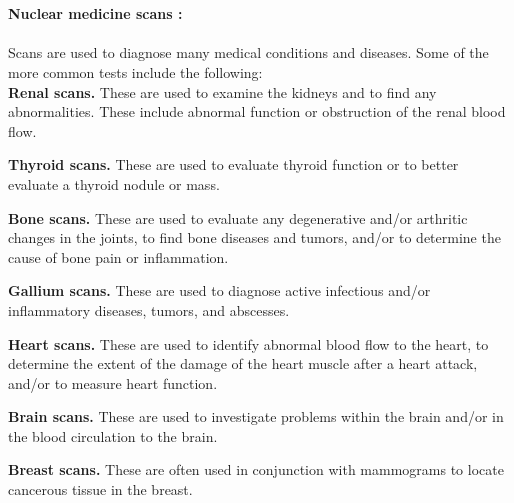 \documentclass[12pt]{article}
\begin{document}
\\ \\\noindent  \textbf{\large  Nuclear medicine scans :} \\ \\ Scans are used to diagnose many medical conditions and diseases. Some of the more common tests include the following:\\

\noindent \textbf{\large  Renal scans.} These are used to examine the kidneys and to find any abnormalities. These include abnormal function or obstruction of the renal blood flow.

\noindent \textbf{\large Thyroid scans.} These are used to evaluate thyroid function or to better evaluate a thyroid nodule or mass.

\noindent \textbf{\large Bone scans.} These are used to evaluate any degenerative and/or arthritic changes in the joints, to find bone diseases and tumors, and/or to determine the cause of bone pain or inflammation.

\noindent \textbf{\large Gallium scans.} These are used to diagnose active infectious and/or inflammatory diseases, tumors, and abscesses.

\noindent \textbf{\large Heart scans.} These are used to identify abnormal blood flow to the heart, to determine the extent of the damage of the heart muscle after a heart attack, and/or to measure heart function.

\noindent \textbf{\large Brain scans.} These are used to investigate problems within the brain and/or in the blood circulation to the brain.

\noindent \textbf{\large Breast scans.} These are often used in conjunction with mammograms to locate cancerous tissue in the breast.\\
\end{document}
